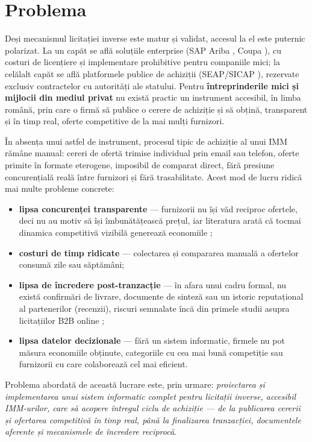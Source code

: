 \section{Problema}

Deși mecanismul licitației inverse este matur și validat, accesul la el este puternic polarizat. La un capăt se află soluțiile enterprise (SAP Ariba \cite{aribaweb}, Coupa \cite{coupaweb}), cu costuri de licențiere și implementare prohibitive pentru companiile mici; la celălalt capăt se află platformele publice de achiziții (SEAP/SICAP \cite{seapweb}), rezervate exclusiv contractelor cu autorități ale statului. Pentru \textbf{întreprinderile mici și mijlocii din mediul privat} nu există practic un instrument accesibil, în limba română, prin care o firmă să publice o cerere de achiziție și să obțină, transparent și în timp real, oferte competitive de la mai mulți furnizori.

În absența unui astfel de instrument, procesul tipic de achiziție al unui IMM rămâne manual: cereri de ofertă trimise individual prin email sau telefon, oferte primite în formate eterogene, imposibil de comparat direct, fără presiune concurențială reală între furnizori și fără trasabilitate. Acest mod de lucru ridică mai multe probleme concrete:

\begin{itemize}
    \item \textbf{lipsa concurenței transparente} --- furnizorii nu își văd reciproc ofertele, deci nu au motiv să își îmbunătățească prețul, iar literatura arată că tocmai dinamica competitivă vizibilă generează economiile \cite{jap2002, carter2004};
    \item \textbf{costuri de timp ridicate} --- colectarea și compararea manuală a ofertelor consumă zile sau săptămâni;
    \item \textbf{lipsa de încredere post-tranzacție} --- în afara unui cadru formal, nu există confirmări de livrare, documente de sinteză sau un istoric reputațional al partenerilor (recenzii), riscuri semnalate încă din primele studii asupra licitațiilor B2B online \cite{emiliani2000, smeltzer2003};
    \item \textbf{lipsa datelor decizionale} --- fără un sistem informatic, firmele nu pot măsura economiile obținute, categoriile cu cea mai bună competiție sau furnizorii cu care colaborează cel mai eficient.
\end{itemize}

Problema abordată de această lucrare este, prin urmare: \textit{proiectarea și implementarea unui sistem informatic complet pentru licitații inverse, accesibil IMM-urilor, care să acopere întregul ciclu de achiziție --- de la publicarea cererii și ofertarea competitivă în timp real, până la finalizarea tranzacției, documentele aferente și mecanismele de încredere reciprocă}.

